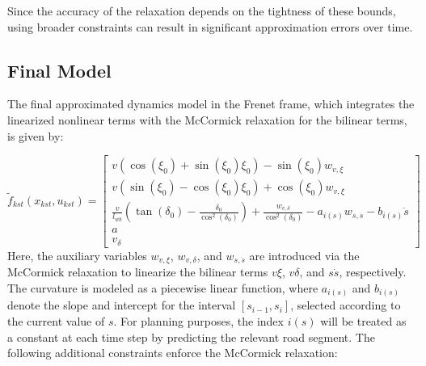 Since the accuracy of the relaxation depends on the tightness of these bounds, using broader constraints can result in significant approximation
errors over time.

\subsection{Final Model} \label{subsec:bicycle_resulting_model}

The final approximated dynamics model in the Frenet frame, which integrates the linearized nonlinear terms with the McCormick relaxation for the bilinear terms, is given by:

\begin{equation}
	\label{eq:kst_final_dynamics}
	\tilde{f}_{kst}(x_{kst}, u_{kst}) =
	\begin{bmatrix}
		v (\cos(\xi_0) + \sin(\xi_0)\xi_0) - \sin(\xi_0) w_{v,\xi}                                                                                                 \\[8pt]
		v (\sin(\xi_0) - \cos(\xi_0)\xi_0) + \cos(\xi_0) w_{v,\xi}                                                                                                 \\[8pt]
		\frac{v}{l_{wb}} (\tan(\delta_0) - \frac{\delta_0}{\cos^2(\delta_0)}) + \frac{w_{v,\delta}}{\cos^2(\delta_0)}  - a_{i(s)} w_{s,\dot{s}} - b_{i(s)} \dot{s} \\[8pt]
		a                                                                                                                                                          \\[8pt]
		v_\delta
	\end{bmatrix}
\end{equation}
Here, the auxiliary variables $w_{v,\xi}$, $w_{v,\delta}$, and $w_{s,\dot{s}}$ are introduced via the McCormick relaxation to linearize the bilinear
terms $v\xi$, $v\delta$, and $s\dot{s}$, respectively.
The curvature is modeled as a piecewise linear function, where $a_{i(s)}$ and $b_{i(s)}$ denote the slope and intercept for the interval $[s_{i-1},
			s_i]$, selected according to the current value of $s$.
For planning purposes, the index $i(s)$ will be treated as a constant at each time step by predicting the relevant road segment.
The following additional constraints enforce the McCormick relaxation:

